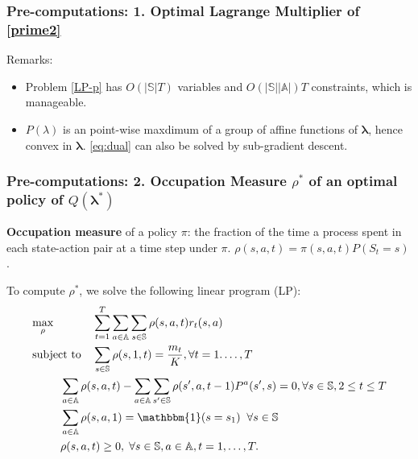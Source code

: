 \documentclass{beamer}
\newcommand{\lambdav}{\pmb{\lambda}}
\newcommand{\ind}[1]{\mathbbm{1}(#1)}
\newcommand{\substates}{\mathbb{S}}
\newcommand{\substate}{s}
\newcommand{\subactions}{\mathbb{A}}
\newcommand{\subpr}{P}
\begin{document}
\begin{frame}
\frametitle{Pre-computations: 1. Optimal Lagrange Multiplier of \eqref{prime2}}
Remarks:
\begin{itemize}
\item Problem \eqref{LP-p} has $O(|\substates|T)$ variables and $O(|\substates||\subactions|)T$ constraints, which is manageable.
\item $P(\lambda)$ is an point-wise maxdimum of a group of affine functions of $\lambdav$, hence convex in $\lambdav$. \eqref{eq:dual} can also be solved by sub-gradient descent.
\end{itemize}
\end{frame}

\begin{frame}
\frametitle{Pre-computations: 2. Occupation Measure $\rho^*$ of an optimal policy of $Q(\lambdav^*)$}
\textbf{Occupation measure} of a policy $\pi$: the fraction of the time a process spent in each state-action pair at a time step under $\pi$. $\rho(s,a,t) = \pi(s,a,t)P(S_t=s)$.

\vspace{0.5cm}
To compute $\rho^*$, we solve the following linear program (LP):
\small
\begin{equation}\label{eq:lp}
\begin{aligned}
& \underset{\rho}{\text{max}}
& & \sum_{t=1}^{T}\sum_{a\in\subactions}\sum_{s\in\substates}\rho(s,a,t)r_t(s,a) \\
& \text{subject to}
& & \sum_{s\in\substates}\rho(s,1,t)=\frac{m_t}{K}, \forall t=1.\ldots,T\\
& & & \hspace{-1cm}\sum_{a\in \subactions}\rho(s,a,t) - \sum_{a\in\subactions}\sum_{s'\in\substates}\rho(s',a,t-1)\subpr^{a}(s',s)=0, \forall \substate\in\substates,2\leq t\leq T\\
& & & \hspace{-1cm}\sum_{a\in\subactions}\rho(s,a,1)=\ind{s=s_1} \;\;\forall s\in\substates\\
& & & \hspace{-1cm}\rho(s,a,t)\geq 0, \; \forall s\in\substates,a\in\subactions,t=1,\ldots,T.
\end{aligned}
\end{equation}
\end{frame}
\end{document}
